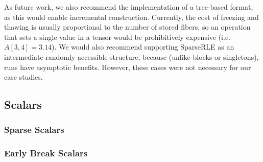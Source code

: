 As future work, we also recommend the implementation of a tree-based format, as
this would enable incremental construction. Currently, the cost of freezing and
thawing is usually proportional to the number of stored fibers, so an operation
that sets a single value in a tensor would be prohibitively expensive (i.e.
$A[3, 4] = 3.14$). We would also recommend supporting SparseRLE as an
intermediate randomly accessible structure, because (unlike blocks or
singletons), runs have asymptotic benefits. However, these cases were not
necessary for our case studies.

\subsection{Scalars}

\subsubsection{Sparse Scalars}
\subsubsection{Early Break Scalars}